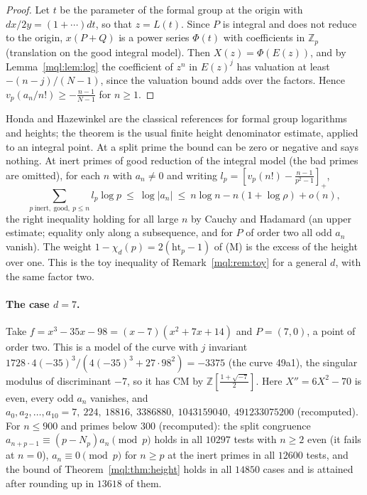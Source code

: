 \begin{proof}
Let $t$ be the parameter of the formal group at the origin with $dx/2y=(1+\cdots)dt$, so that $z=L(t)$. Since $P$ is integral and does not reduce to the origin, $x(P+Q)$ is a power series $\Phi(t)$ with coefficients in $\mathbb Z_p$ (translation on the good integral model). Then $X(z)=\Phi(E(z))$, and by Lemma~\ref{mql:lem:log} the coefficient of $z^n$ in $E(z)^j$ has valuation at least $-(n-j)/(N-1)$, since the valuation bound adds over the factors. Hence $v_p(a_n/n!)\ge-\frac{n-1}{N-1}$ for $n\ge1$.
\end{proof}

Honda \cite{Honda70} and Hazewinkel \cite{Hazewinkel78} are the classical references for formal group logarithms and heights; the theorem is the usual finite height denominator estimate, applied to an integral point. At a split prime the bound can be zero or negative and says nothing. At inert primes of good reduction of the integral model (the bad primes are omitted), for each $n$ with $a_n\ne0$ and writing $l_p=[v_p(n!)-\frac{n-1}{p^2-1}]_+$,
\[
\sum_{p\ \mathrm{inert,\ good},\ p\le n}l_p\log p\ \le\ \log|a_n|\ \le\ n\log n-n(1+\log\rho)+o(n),
\]
the right inequality holding for all large $n$ by Cauchy and Hadamard (an upper estimate; equality only along a subsequence, and for $P$ of order two all odd $a_n$ vanish). The weight $1-\chi_{d}(p)=2(\mathrm{ht}_p-1)$ of (M) is the excess of the height over one. This is the toy inequality of Remark~\ref{mql:rem:toy} for a general $d$, with the same factor two.

\paragraph{The case $d=7$.} Take $f=x^3-35x-98=(x-7)(x^2+7x+14)$ and $P=(7,0)$, a point of order two. This is a model of the curve with $j$ invariant $1728\cdot4(-35)^3/(4(-35)^3+27\cdot98^2)=-3375$ (the curve 49a1), the singular modulus of discriminant $-7$, so it has CM by $\mathbb Z[\frac{1+\sqrt{-7}}2]$. Here $X''=6X^2-70$ is even, every odd $a_n$ vanishes, and $a_0,a_2,\dots,a_{10}=7,\ 224,\ 18816,\ 3386880,\ 1043159040,\ 491233075200$ (recomputed). For $n\le900$ and primes below $300$ (recomputed): the split congruence $a_{n+p-1}\equiv(p-N_p)a_n\pmod p$ holds in all $10297$ tests with $n\ge2$ even (it fails at $n=0$), $a_n\equiv0\pmod p$ for $n\ge p$ at the inert primes in all $12600$ tests, and the bound of Theorem~\ref{mql:thm:height} holds in all $14850$ cases and is attained after rounding up in $13618$ of them.

